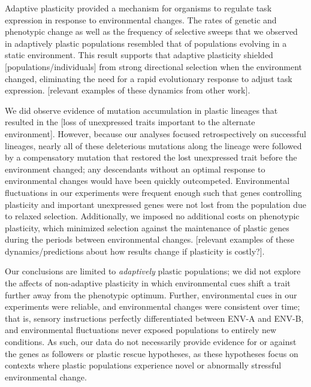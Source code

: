 Adaptive plasticity provided a mechanism for organisms to regulate task expression in response to environmental changes.
The rates of genetic and phenotypic change as well as the frequency of selective sweeps that we observed in adaptively plastic populations resembled that of populations evolving in a static environment.
This result supports that adaptive plasticity shielded [populations/individuals] from strong directional selection when the environment changed, eliminating the need for a rapid evolutionary response to adjust task expression. 
[relevant examples of these dynamics from other work].

We did observe evidence of mutation accumulation in plastic lineages that resulted in the [loss of unexpressed traits important to the alternate environment].
However, because our analyses focused retrospectively on successful lineages, nearly all of these deleterious mutations along the lineage were followed by a compensatory mutation that restored the lost unexpressed trait before the environment changed; any descendants without an optimal response to environmental changes would have been quickly outcompeted.
Environmental fluctuations in our experiments were frequent enough such that genes controlling plasticity and important unexpressed genes were not lost from the population due to relaxed selection.
Additionally, we imposed no additional costs on phenotypic plasticity, which minimized selection against the maintenance of plastic genes during the periods between environmental changes.  
[relevant examples of these dynamics/predictions about how results change if plasticity is costly?].

Our conclusions are limited to \textit{adaptively} plastic populations; we did not explore the affects of non-adaptive plasticity in which environmental cues shift a trait further away from the phenotypic optimum.
Further, environmental cues in our experiments were reliable, and environmental changes were consistent over time; that is, sensory instructions perfectly differentiated between ENV-A and ENV-B, and environmental fluctuations never exposed populations to entirely new conditions.
As such, our data do not necessarily provide evidence for or against the genes as followers or plastic rescue hypotheses, as these hypotheses focus on contexts where plastic populations experience novel or abnormally stressful environmental change.

